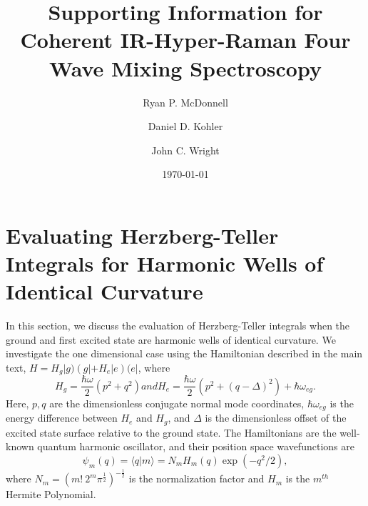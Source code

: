 \documentclass[aip, jcp, reprint, onecolumn, nofootinbib]{revtex4-2}
\begin{document}
\title{Supporting Information for Coherent IR-Hyper-Raman Four Wave Mixing Spectroscopy}


\author{Ryan P. McDonnell} 
\author{Daniel D. Kohler}
\author{John C. Wright} 


\date{\today}

\maketitle
\tableofcontents
\clearpage


\section{Evaluating Herzberg-Teller Integrals for Harmonic Wells of Identical Curvature}

In this section, we discuss the evaluation of Herzberg-Teller integrals when the ground and first excited state are harmonic wells of identical curvature.\cite{HerzbergTeller1933}
We investigate the one dimensional case using the Hamiltonian described in the main text, $H = H_g |g) \left(g| + H_e |e\right) (e|$, where
\begin{subequations}\label{Hamiltonian}
	\begin{equation}
		H_g = \frac{\hbar \omega }{2} \left(p^2 + q^2 \right)
	\end{equation}
	and
	\begin{equation}
		H_e = \frac{\hbar \omega }{2} \left(p^2 +  (q-\Delta)^2 \right) + \hbar \omega_{eg}.
	\end{equation} 
\end{subequations}
Here, $p,q$ are the dimensionless conjugate normal mode coordinates, $\hbar\omega_{eg}$ is the energy difference between $H_e$ and $H_g$, and $\Delta$ is the dimensionless offset of the excited state surface relative to the ground state.
The Hamiltonians are the well-known quantum harmonic oscillator, and their position space wavefunctions are
\begin{equation}
	\psi_m(q) = \langle q | m \rangle = N_m H_m(q) \exp(-q^2/2),
\end{equation}
where $N_m = (m! \ 2^m \pi^{\frac{1}{2}})^{-\frac{1}{2}}$ is the normalization factor and $H_m$ is the $m^{th}$ Hermite Polynomial.\cite{RN230, MorseFeshbach}
\end{document}
